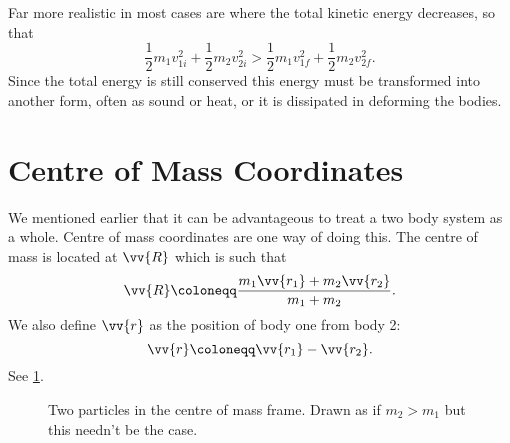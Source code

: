     Far more realistic in most cases are  where the total kinetic energy decreases, so that
    \begin{equation}
        \frac{1}{2}m_1v_{1i}^2 + \frac{1}{2}m_2v_{2i}^2 > \frac{1}{2}m_1v_{1f}^2 + \frac{1}{2}m_2v_{2f}^2.
    \end{equation}
    Since the total energy is still conserved this energy must be transformed into another form, often as sound or heat, or it is dissipated in deforming the bodies.
    
    \section{Centre of Mass Coordinates}
    We mentioned earlier that it can be advantageous to treat a two body system as a whole.
    Centre of mass coordinates are one way of doing this.
    The centre of mass is located at \(\vv{R}\) which is such that
    \begin{equation}
        \vv{R} \coloneqq \frac{m_1\vv{r_1} + m_2\vv{r_2}}{m_1 + m_2}.
    \end{equation}
    We also define \(\vv{r}\) as the position of body one from body 2:
    \begin{equation}
        \vv{r} \coloneqq \vv{r_1} - \vv{r_2}.
    \end{equation}
    See \cref{fig:centre of mass coord}.
    
    \begin{figure}
        \caption{Two particles in the centre of mass frame. Drawn as if \(m_2 > m_1\) but this needn't be the case.}
        \label{fig:centre of mass coord}
    \end{figure}
    
